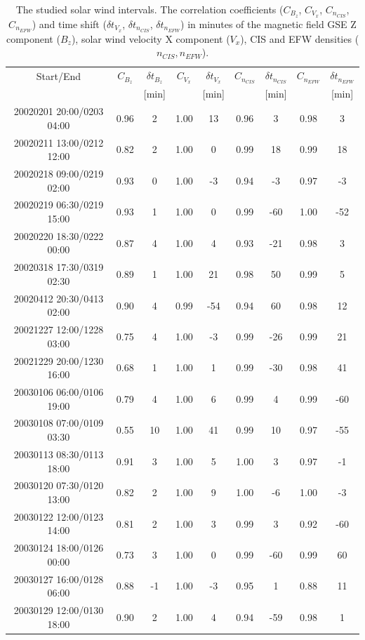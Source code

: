 \documentclass[linenumbers,draft]{agujournal}
\begin{document}
\pagebreak


\pagebreak

\begin{table}[h]
\setlength{\tabcolsep}{3pt}
\centering
\begin{tabular}{c||cc|cc|cc|cc}
\hline
Start/End & $C_{B_{z}}$ & $\delta t_{B_{z}}$ & $C_{V_{x}}$ & $\delta t_{V_{x}}$ & $C_{n_{CIS}}$ & $\delta t_{n_{CIS}}$ & $C_{n_{EFW}}$ & $\delta t_{n_{EFW}}$ \\
& & [min] & & [min] & & [min] & & [min] \\
\hline
20020201 20:00/0203 04:00 & 0.96 & 2 & 1.00 & 13 & 0.96 & 3 & 0.98 & 3 \\
20020211 13:00/0212 12:00 & 0.82 & 2 & 1.00 & 0 & 0.99 & 18 & 0.99 & 18 \\
20020218 09:00/0219 02:00 & 0.93 & 0 & 1.00 & -3 & 0.94 & -3 & 0.97 & -3 \\
20020219 06:30/0219 15:00 & 0.93 & 1 & 1.00 & 0 & 0.99 & -60 & 1.00 & -52 \\
20020220 18:30/0222 00:00 & 0.87 & 4 & 1.00 & 4 & 0.93 & -21 & 0.98 & 3 \\
20020318 17:30/0319 02:30 & 0.89 & 1 & 1.00 & 21 & 0.98 & 50 & 0.99 & 5 \\
20020412 20:30/0413 02:00 & 0.90 & 4 & 0.99 & -54 & 0.94 & 60 & 0.98 & 12 \\
20021227 12:00/1228 03:00 & 0.75 & 4 & 1.00 & -3 & 0.99 & -26 & 0.99 & 21 \\
20021229 20:00/1230 16:00 & 0.68 & 1 & 1.00 & 1 & 0.99 & -30 & 0.98 & 41 \\
20030106 06:00/0106 19:00 & 0.79 & 4 & 1.00 & 6 & 0.99 & 4 & 0.99 & -60 \\
20030108 07:00/0109 03:30 & 0.55 & 10 & 1.00 & 41 & 0.99 & 10 & 0.97 & -55 \\
20030113 08:30/0113 18:00 & 0.91 & 3 & 1.00 & 5 & 1.00 & 3 & 0.97 & -1 \\
20030120 07:30/0120 13:00 & 0.82 & 2 & 1.00 & 9 & 1.00 & -6 & 1.00 & -3 \\
20030122 12:00/0123 14:00 & 0.81 & 2 & 1.00 & 3 & 0.99 & 3 & 0.92 & -60 \\
20030124 18:00/0126 00:00 & 0.73 & 3 & 1.00 & 0 & 0.99 & -60 & 0.99 & 60 \\
20030127 16:00/0128 06:00 & 0.88 & -1 & 1.00 & -3 & 0.95 & 1 & 0.88 & 11 \\
20030129 12:00/0130 18:00 & 0.90 & 2 & 1.00 & 4 & 0.94 & -59 & 0.98 & 1 \\
\hline
\end{tabular}
\caption{The studied solar wind intervals.  The correlation coefficients ($C_{B_{z}}$, $C_{V_{x}}$, $C_{n_{CIS}}$, $C_{n_{EFW}}$) and time shift ($\delta t_{V_{x}}$, $\delta t_{n_{CIS}}$, $\delta t_{n_{EFW}}$) in minutes of the magnetic field GSE Z component ($B_z$), solar wind velocity X component ($V_x$), CIS and EFW densities ($n_{CIS}, n_{EFW}$).\label{tab:sw}}
\end{table}
\end{document}
